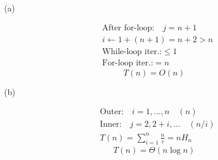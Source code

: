 \documentclass[11pt]{article}
\begin{document}
\noindent
\begin{minipage}[t]{0.04\textwidth}
\vspace{0pt}
(a)
\end{minipage}%
\begin{minipage}[t]{0.50\textwidth}
\vspace{0pt}
\begin{algorithm}[H]
\DontPrintSemicolon
{}
\end{algorithm}
\end{minipage}%
\begin{minipage}[t]{0.46\textwidth}
\vspace{0pt}
\begin{align*}
&\text{After for-loop:} \quad j = n + 1 \\
&i \leftarrow 1 + (n+1) = n + 2 > n \\
&\text{While-loop iter.:} \le 1 \\
&\text{For-loop iter.:} = n
\end{align*}
\[
\boxed{T(n) = O(n)}
\]
\end{minipage}

\vspace{1em}

\noindent
\begin{minipage}[t]{0.04\textwidth}
\vspace{0pt}
(b)
\end{minipage}%
\begin{minipage}[t]{0.50\textwidth}
\vspace{0pt}
\begin{algorithm}[H]
\DontPrintSemicolon
{}
\end{algorithm}
\end{minipage}%
\begin{minipage}[t]{0.46\textwidth}
\vspace{0pt}
\begin{align*}
&\text{Outer:} \quad i = 1, \ldots, n \quad (n) \\
&\text{Inner:} \quad j = 2, 2{+}i, \ldots \quad (n/i) \\
&T(n) = \sum_{i=1}^{n} \frac{n}{i} = n H_n
\end{align*}
\[
\boxed{T(n) = \Theta(n \log n)}
\]
\end{minipage}
\end{document}
